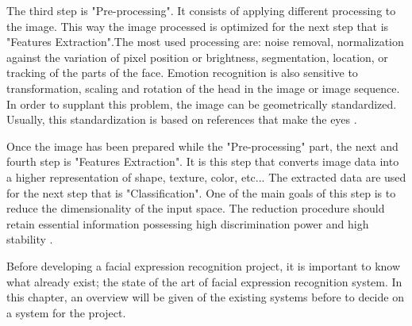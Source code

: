 \noindent The third step is "Pre-processing". It consists of applying different processing to the image. This way the image processed is optimized for the next step that is "Features Extraction".The most used processing are: noise removal, normalization against the variation of pixel position or brightness, segmentation, location, or tracking of the parts of the face. Emotion recognition is also sensitive to transformation, scaling and rotation of the head in the image or image sequence. In order to supplant this problem, the image can be geometrically standardized. Usually, this standardization is based on references that make the eyes \cite{CHI03}.
\newline

\noindent Once the image has been prepared while the "Pre-processing" part, the next and fourth step is "Features Extraction". It is this step that converts image data into a higher representation of shape, texture, color, etc... The extracted data are used for the next step that is "Classification". One of the main goals of this step is to reduce the dimensionality of the input space. The reduction procedure should retain essential information possessing high discrimination power and high stability \cite{CHI03}.
\newline

\noindent Before developing a facial expression recognition project, it is important to know what already exist; the state of the art of facial expression recognition system. In this chapter, an overview will be given of the existing systems before to decide on a system for the project.
\newline
